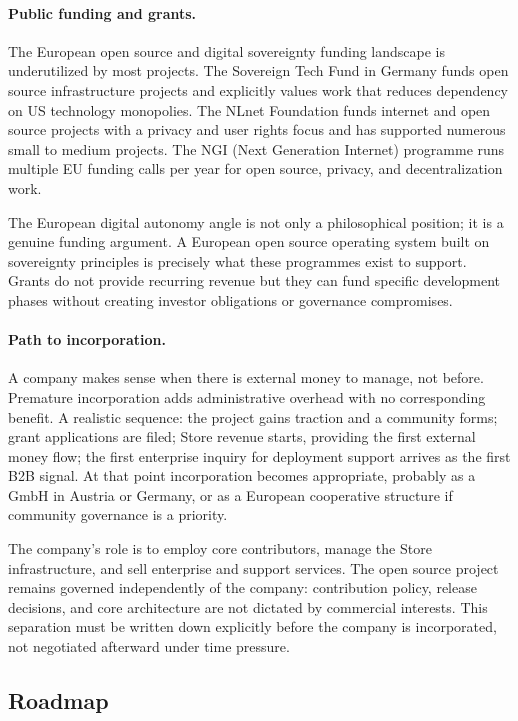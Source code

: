 \paragraph{Public funding and grants.}
The European open source and digital sovereignty funding landscape is
underutilized by most projects. The Sovereign Tech Fund in Germany funds open
source infrastructure projects and explicitly values work that reduces
dependency on US technology monopolies. The NLnet Foundation funds internet and
open source projects with a privacy and user rights focus and has supported
numerous small to medium projects. The NGI (Next Generation Internet) programme
runs multiple EU funding calls per year for open source, privacy, and
decentralization work.

The European digital autonomy angle is not only a philosophical position; it is
a genuine funding argument. A European open source operating system built on
sovereignty principles is precisely what these programmes exist to support.
Grants do not provide recurring revenue but they can fund specific development
phases without creating investor obligations or governance compromises.

\paragraph{Path to incorporation.}
A company makes sense when there is external money to manage, not before.
Premature incorporation adds administrative overhead with no corresponding
benefit. A realistic sequence: the project gains traction and a community
forms; grant applications are filed; Store revenue starts, providing the first
external money flow; the first enterprise inquiry for deployment support
arrives as the first B2B signal. At that point incorporation becomes
appropriate, probably as a GmbH in Austria or Germany, or as a European
cooperative structure if community governance is a priority.

The company's role is to employ core contributors, manage the Store
infrastructure, and sell enterprise and support services. The open source
project remains governed independently of the company: contribution policy,
release decisions, and core architecture are not dictated by commercial
interests. This separation must be written down explicitly before the company
is incorporated, not negotiated afterward under time pressure.

\subsection{Roadmap}
\label{sec:roadmap}

